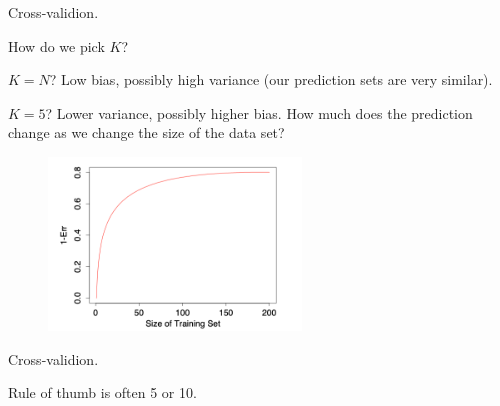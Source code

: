 \documentclass[xcolor={table}, handout]{beamer}
\begin{document}
\begin{frame}{Cross-validion.}

\begin{wideitemize}
\item How do we pick $K$?\pause
\item $K = N$? \pause Low bias, possibly high variance (our prediction sets are very similar). \pause
\item $K = 5$? \pause Lower variance, possibly higher bias. \pause How much does the prediction change as we change the size of the data set?\pause
\begin{figure}
\centering
\includegraphics[width = 0.6\textwidth]{../assets/tibshirani7-8.png}
\end{figure}
\hfill \cite{hastie2009elements}
\end{wideitemize}

\end{frame}



\begin{frame}{Cross-validion.}

\begin{wideitemize}
\item Rule of thumb is often 5 or 10.
\end{wideitemize}

\end{frame}


\end{document}
